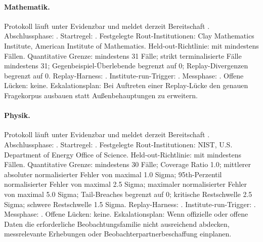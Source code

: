 \paragraph{Mathematik.}
Protokoll  läuft unter Evidenzbar  und meldet derzeit Bereitschaft .
Abschlussphase: . Startregel: .
Festgelegte Rout-Institutionen: Clay Mathematics Institute, \allowbreak American Institute of Mathematics.
Held-out-Richtlinie:  mit mindestens  Fällen.
Quantitative Grenze: mindestens 31 Fälle; strikt terminalisierte Fälle mindestens 31; Gegenbeispiel-Überlebende begrenzt auf 0; Replay-Divergenzen begrenzt auf 0.
Replay-Harness: .
Institute-run-Trigger: . Messphase: .
Offene Lücken: keine.
Eskalationsplan: Bei Auftreten einer Replay-Lücke den genauen Fragekorpus ausbauen statt Außenbehauptungen zu erweitern.

\paragraph{Physik.}
Protokoll  läuft unter Evidenzbar  und meldet derzeit Bereitschaft .
Abschlussphase: . Startregel: .
Festgelegte Rout-Institutionen: NIST, \allowbreak U.S. Department of Energy Office of Science.
Held-out-Richtlinie:  mit mindestens  Fällen.
Quantitative Grenze: mindestens 30 Fälle; Coverage Ratio 1.0; mittlerer absoluter normalisierter Fehler von maximal 1.0 Sigma; 95th-Perzentil normalisierter Fehler von maximal 2.5 Sigma; maximaler normalisierter Fehler von maximal 5.0 Sigma; Tail-Breaches begrenzt auf 0; kritische Restschwelle 2.5 Sigma; schwere Restschwelle 1.5 Sigma.
Replay-Harness: .
Institute-run-Trigger: . Messphase: .
Offene Lücken: keine.
Eskalationsplan: Wenn offizielle oder offene Daten die erforderliche Beobachtungsfamilie nicht ausreichend abdecken, messrelevante Erhebungen oder Beobachterpartnerbeschaffung einplanen.

